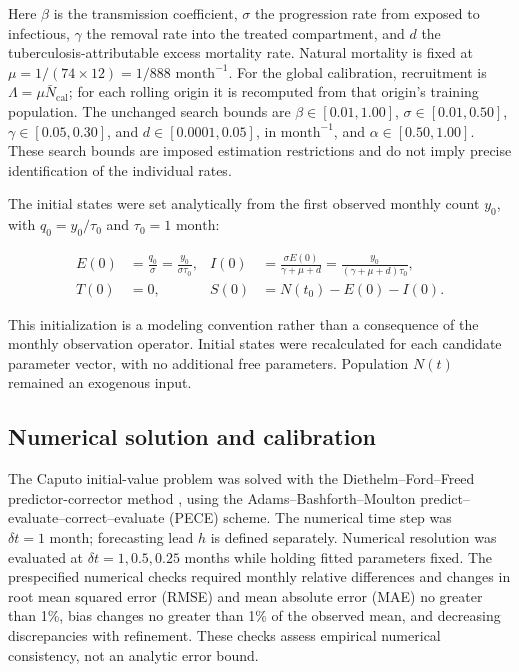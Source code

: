 \documentclass[pdflatex,sn-mathphys-ay,lineno]{sn-jnl}
\begin{document}
Here $\beta$ is the transmission coefficient, $\sigma$ the progression rate from exposed to infectious, $\gamma$ the removal rate into the treated compartment, and $d$ the tuberculosis-attributable excess mortality rate. Natural mortality is fixed at $\mu=1/(74\times12)=1/888\text{ month}^{-1}$. For the global calibration, recruitment is $\Lambda=\mu\bar N_{\mathrm{cal}}$; for each rolling origin it is recomputed from that origin's training population. The unchanged search bounds are $\beta\in[0.01,1.00]$, $\sigma\in[0.01,0.50]$, $\gamma\in[0.05,0.30]$, and $d\in[0.0001,0.05]$, in $\text{month}^{-1}$, and $\alpha\in[0.50,1.00]$. These search bounds are imposed estimation restrictions and do not imply precise identification of the individual rates.

The initial states were set analytically from the first observed monthly count $y_0$, with $q_0=y_0/\tau_0$ and $\tau_0=1\text{ month}$:

\[
\begin{aligned}
E(0)&=\frac{q_0}{\sigma}=\frac{y_0}{\sigma\tau_0}, &
I(0)&=\frac{\sigma E(0)}{\gamma+\mu+d}=\frac{y_0}{(\gamma+\mu+d)\tau_0},\\
T(0)&=0, & S(0)&=N(t_0)-E(0)-I(0).
\end{aligned}
\]

This initialization is a modeling convention rather than a consequence of the monthly observation operator. Initial states were recalculated for each candidate parameter vector, with no additional free parameters. Population $N(t)$ remained an exogenous input.

\subsection{Numerical solution and calibration}

The Caputo initial-value problem was solved with the Diethelm--Ford--Freed predictor-corrector method \citep{diethelm2002}, using the Adams--Bashforth--Moulton predict--evaluate--correct--evaluate (PECE) scheme. The numerical time step was $\delta t=1\text{ month}$; forecasting lead $h$ is defined separately. Numerical resolution was evaluated at $\delta t=1,0.5,0.25$ months while holding fitted parameters fixed. The prespecified numerical checks required monthly relative differences and changes in root mean squared error (RMSE) and mean absolute error (MAE) no greater than 1\%, bias changes no greater than 1\% of the observed mean, and decreasing discrepancies with refinement. These checks assess empirical numerical consistency, not an analytic error bound.
\end{document}
